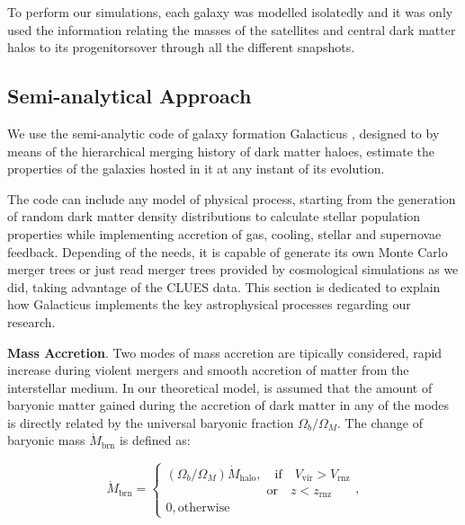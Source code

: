 \documentclass[usenatbib]{mn2e}
\begin{document}
 To perform our simulations, each galaxy was modelled isolatedly and
 it was only used the information relating the masses of the
 satellites and central dark matter halos to its progenitorsover
 through all the different snapshots. 




\subsection{Semi-analytical Approach}
\label{sec:sams}
We use the semi-analytic code of galaxy formation Galacticus
\citep{2010arXiv1008.1786B}, designed to  by means of the hierarchical
merging history of  dark matter haloes, estimate the properties of the
galaxies hosted in it at any instant of its evolution.   

The code can include any model of physical process, starting from the
generation of random dark matter density distributions to calculate
stellar population properties while implementing accretion of gas,
cooling, stellar and supernovae feedback. Depending of the needs, it
is capable of generate its own Monte Carlo merger trees or just read
merger trees provided by cosmological simulations as we did,  taking
advantage of the CLUES  data. This section is dedicated to explain how
Galacticus implements the key astrophysical processes regarding our
research. 


\textbf{Mass Accretion}. 
Two modes of mass accretion are tipically considered, rapid increase
during violent mergers and  smooth accretion of matter from the
interstellar medium. In our theoretical model, is assumed that the
amount of baryonic matter gained during the accretion of dark matter
in any of the modes  is directly related by the universal baryonic
fraction $\Omega_b/\Omega_M$. The change of baryonic mass
$\dot{M}_{\text{brn}}$ is defined as: 

\begin{equation}
 \dot{M}_{\text{brn}}=
\begin{cases}
 (\Omega_b/\Omega_M)\dot{M}_{\text{halo}},\quad \text{if} \quad V_{\text{vir}}>V_{\text{rnz}}\\
\qquad \qquad \qquad \qquad \text{or} \quad z<z_{\text{rnz}}\\
0, \text{otherwise}
\end{cases},
\end{equation}
\end{document}
